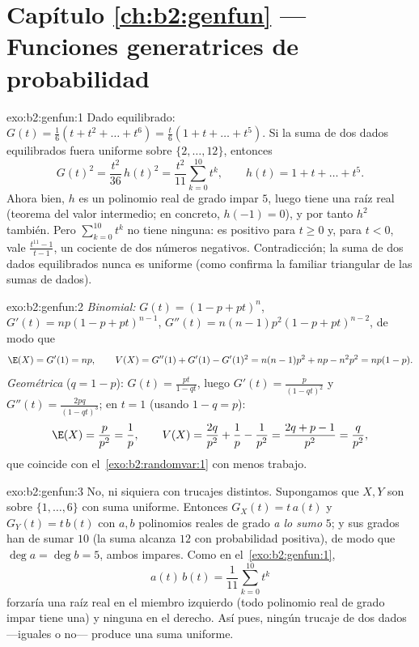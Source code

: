 \section*{Capítulo \ref{ch:b2:genfun} --- Funciones generatrices de probabilidad}

\begin{solution}{exo:b2:genfun:1}
Dado equilibrado: $G(t) = \frac16(t + t^2 + \dots + t^6) = \frac
t6(1 + t + \dots + t^5)$. Si la suma de dos dados equilibrados fuera
uniforme sobre $\{2, \dots, 12\}$, entonces
\[
G(t)^2 = \frac{t^2}{36}\,h(t)^2
= \frac{t^2}{11}\sum_{k=0}^{10}t^k ,
\qquad h(t) = 1 + t + \dots + t^5 .
\]
Ahora bien, $h$ es un polinomio real de grado impar $5$, luego tiene
una raíz real (teorema del valor intermedio; en concreto, $h(-1) =
0$), y por tanto $h^2$ también. Pero $\sum_{k=0}^{10}t^k$ no tiene
ninguna: es positivo para $t \geq 0$ y, para $t < 0$, vale
$\frac{t^{11} - 1}{t - 1}$, un cociente de dos números negativos.
Contradicción; la suma de dos dados equilibrados nunca es uniforme
(como confirma la familiar  triangular de las sumas de
dados).
\end{solution}

\begin{solution}{exo:b2:genfun:2}
\emph{Binomial:} $G(t) = (1 - p + pt)^n$, $G'(t) = np(1 - p +
pt)^{n-1}$, $G''(t) = n(n-1)p^2(1 - p + pt)^{n-2}$, de modo que
\[
\E(X) = G'(1) = np,
\qquad
V(X) = G''(1) + G'(1) - G'(1)^2
= n(n-1)p^2 + np - n^2p^2 = np(1-p).
\]
\emph{Geométrica} ($q = 1 - p$): $G(t) = \frac{pt}{1 - qt}$, luego
$G'(t) = \frac{p}{(1 - qt)^2}$ y $G''(t) = \frac{2pq}{(1 - qt)^3}$;
en $t = 1$ (usando $1 - q = p$):
\[
\E(X) = \frac{p}{p^2} = \frac1p,
\qquad
V(X) = \frac{2q}{p^2} + \frac1p - \frac{1}{p^2}
= \frac{2q + p - 1}{p^2}
= \frac{q}{p^2} ,
\]
que coincide con el~\cref{exo:b2:randomvar:1} con menos trabajo.
\end{solution}

\begin{solution}{exo:b2:genfun:3}
No, ni siquiera con trucajes distintos. Supongamos que $X, Y$ son
 sobre $\{1, \dots, 6\}$ con suma uniforme. Entonces $G_X(t) =
t\,a(t)$ y $G_Y(t) = t\,b(t)$ con $a, b$ polinomios reales de grado
\emph{a lo sumo} $5$; y sus grados han de sumar $10$ (la suma alcanza
$12$ con probabilidad positiva), de modo que $\deg a = \deg b = 5$,
ambos impares. Como en el~\cref{exo:b2:genfun:1},
\[
a(t)\,b(t) = \frac{1}{11}\sum_{k=0}^{10}t^k
\]
forzaría una raíz real en el miembro izquierdo (todo polinomio real
de grado impar tiene una) y ninguna en el derecho. Así pues, ningún
trucaje de dos dados  ---iguales o no--- produce una
suma uniforme.
\end{solution}

